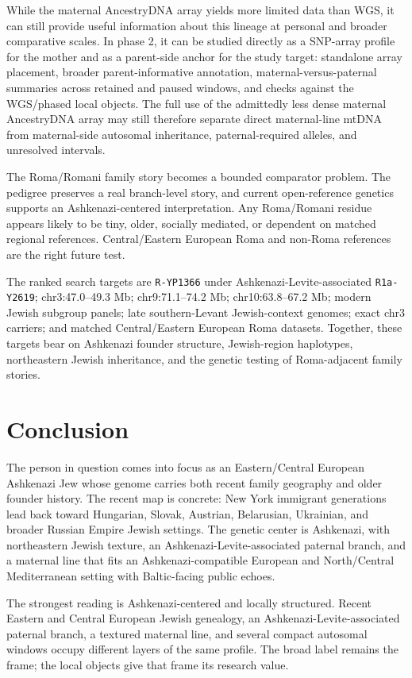 \documentclass[11pt]{article}
\begin{document}
While the maternal AncestryDNA array yields more limited data than WGS, it can still provide useful information about this lineage at personal and broader comparative scales. In phase 2, it can be studied directly as a SNP-array profile for the mother and as a parent-side anchor for the study target: standalone array placement, broader parent-informative annotation, maternal-versus-paternal summaries across retained and paused windows, and checks against the WGS/phased local objects. The full use of the admittedly less dense maternal AncestryDNA array may still therefore separate direct maternal-line mtDNA from maternal-side autosomal inheritance, paternal-required alleles, and unresolved intervals.

The Roma/Romani family story becomes a bounded comparator problem. The pedigree preserves a real branch-level story, and current open-reference genetics supports an Ashkenazi-centered interpretation. Any Roma/Romani residue appears likely to be tiny, older, socially mediated, or dependent on matched regional references. Central/Eastern European Roma and non-Roma references are the right future test.

The ranked search targets are \texttt{R-YP1366} under Ashkenazi-Levite-associated \texttt{R1a-Y2619}; chr3:47.0--49.3 Mb; chr9:71.1--74.2 Mb; chr10:63.8--67.2 Mb; modern Jewish subgroup panels; late southern-Levant Jewish-context genomes; exact chr3 carriers; and matched Central/Eastern European Roma datasets. Together, these targets bear on Ashkenazi founder structure, Jewish-region haplotypes, northeastern Jewish inheritance, and the genetic testing of Roma-adjacent family stories.

\section{Conclusion}

The person in question comes into focus as an Eastern/Central European Ashkenazi Jew whose genome carries both recent family geography and older founder history. The recent map is concrete: New York immigrant generations lead back toward Hungarian, Slovak, Austrian, Belarusian, Ukrainian, and broader Russian Empire Jewish settings. The genetic center is Ashkenazi, with northeastern Jewish texture, an Ashkenazi-Levite-associated paternal branch, and a maternal line that fits an Ashkenazi-compatible European and North/Central Mediterranean setting with Baltic-facing public echoes.

The strongest reading is Ashkenazi-centered and locally structured. Recent Eastern and Central European Jewish genealogy, an Ashkenazi-Levite-associated paternal branch, a textured maternal line, and several compact autosomal windows occupy different layers of the same profile. The broad label remains the frame; the local objects give that frame its research value.
\end{document}
